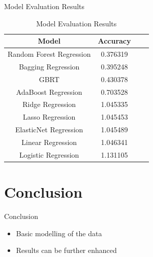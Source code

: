 \documentclass[
 size=14pt,
 paper=smartboard,  %
 mode=present, 		%
 display=slides, 	%
 style=tuliplab,  	%
 pauseslide,
 fleqn,leqno]{powerdot}
\begin{document}
\begin{slide}[toc=,bm=]{Model Evaluation Results}

\begin{table}[tb]
\setlength{\abovecaptionskip}{0pt}
\setlength{\belowcaptionskip}{10pt}
\centering
\caption{Model Evaluation Results}

\begin{tabular}{ c | c | c | c }
\toprule
  Model     & Accuracy      \\
\midrule
Random Forest Regression        & 0.376319   \\
Bagging Regression              & 0.395248    \\
GBRT                            & 0.430378   \\
AdaBoost Regression             & 0.703528   \\ 
Ridge Regression                & 1.045335   \\
Lasso Regression                & 1.045453 \\
ElasticNet Regression           & 1.045489 \\
Linear Regression               & 1.046341 \\
Logistic Regression             & 1.131105 \\
\bottomrule
\end{tabular}
\end{table}



\end{slide}


\section{Conclusion}

\begin{slide}[toc=,bm=]{Conclusion}
\begin{itemize}
\item
\smallskip
Basic modelling of the data

\item
\smallskip
Results can be further enhanced

\end{itemize}

\end{slide}
\end{document}
